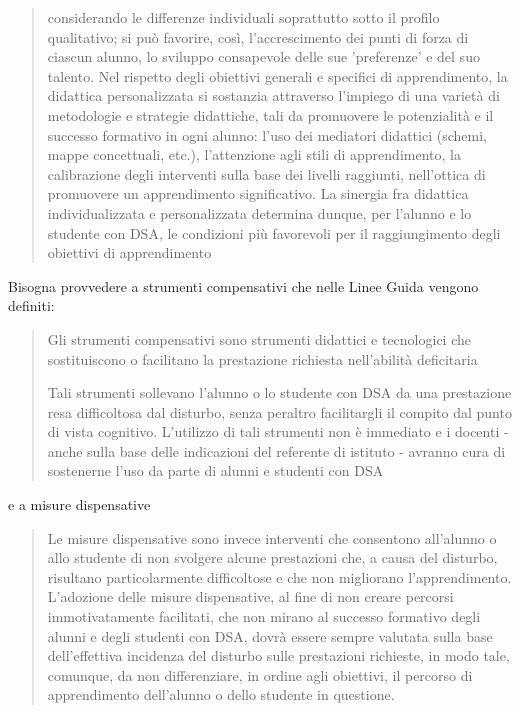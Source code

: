 \begin{quote}
\begin{description}
		considerando le differenze individuali soprattutto sotto il profilo qualitativo; si può favorire, così,
		l'accrescimento dei punti di forza di ciascun alunno, lo sviluppo consapevole delle sue 'preferenze'
		e del suo talento. Nel rispetto degli obiettivi generali e specifici di apprendimento, la didattica
		personalizzata si sostanzia attraverso l'impiego di una varietà di metodologie e strategie didattiche,
		tali da promuovere le potenzialità e il successo formativo in ogni alunno: l'uso dei mediatori
		didattici (schemi, mappe concettuali, etc.), l'attenzione agli stili di apprendimento, la calibrazione
		degli interventi sulla base dei livelli raggiunti, nell'ottica di promuovere un apprendimento
		significativo.
		La sinergia fra didattica individualizzata e personalizzata determina dunque, per l'alunno e lo
		studente con DSA, le condizioni più favorevoli per il raggiungimento degli obiettivi di
		apprendimento\mancatesto
\end{description}
\end{quote}
Bisogna provvedere a strumenti compensativi che nelle Linee Guida vengono definiti:
\begin{quote}
	\begin{description}[style=sameline]
		\item\mancatesto
		
		Gli strumenti compensativi sono strumenti didattici e tecnologici che sostituiscono o facilitano
		la prestazione richiesta nell'abilità deficitaria
		\mancatesto
				
		Tali strumenti sollevano l'alunno o lo studente con DSA da una prestazione resa difficoltosa
		dal disturbo, senza peraltro facilitargli il compito dal punto di vista cognitivo. L'utilizzo di tali
		strumenti non è immediato e i docenti - anche sulla base delle indicazioni del referente di istituto -
		avranno cura di sostenerne l'uso da parte di alunni e studenti con DSA\mancatesto
	\end{description}
\end{quote} 
e a misure dispensative 
\begin{quote}
	\begin{description}[style=sameline]
\item
\mancatesto
	Le misure dispensative sono invece interventi che consentono all'alunno o allo studente di non
	svolgere alcune prestazioni che, a causa del disturbo, risultano particolarmente difficoltose e che
	non migliorano l'apprendimento.
\mancatesto
	L'adozione delle misure dispensative, al fine di non creare percorsi immotivatamente
	facilitati, che non mirano al successo formativo degli alunni e degli studenti con DSA, dovrà essere
	sempre valutata sulla base dell'effettiva incidenza del disturbo sulle prestazioni richieste, in modo
	tale, comunque, da non differenziare, in ordine agli obiettivi, il percorso di apprendimento
	dell'alunno o dello studente in questione.\mancatesto
	\end{description}
\end{quote}
